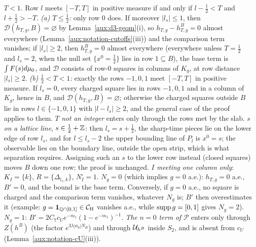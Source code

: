 \begin{auxrem}\label{aux:d3-boundary}
\emph{$T<1$.}  Row $l$ meets $[-T,T]$ in positive measure if and only if $l-\frac12<T$ and
$l+\frac12>-T$.  \emph{(a) $T\le\frac12$:} only row $0$ does.  If moreover $|l_s|\le1$, then
$\mathcal D(h_{T,g},B)=\varnothing$ by Lemma~\ref{aux:d3-geom}(i), so $h_{T,g}-h_{T,g}^B=0$ almost
everywhere (Lemma~\ref{aux:notation-cutoffs}(iii)) and the comparison term vanishes; if
$|l_s|\ge2$, then $h_{T,g}^B=0$ almost everywhere (everywhere unless $T=\frac12$ and $l_s=2$, when the null
set $\{x^0=\frac12\}$ lies in row $1\subseteq B$), the base term is $\int F(s)d\mu_0$, and
$\mathcal D$ consists of row-$0$ squares in columns of $K_g$, at row distance $|l_s|\ge2$.
\emph{(b) $\frac12<T<1$:} exactly the rows $-1,0,1$ meet $[-T,T]$ in positive measure.  If
$l_s=0$, every charged square lies in rows $-1,0,1$ and in a column of $K_g$, hence in $B$, and
$\mathcal D(h_{T,g},B)=\varnothing$; otherwise the charged squares outside $B$ lie in rows
$l\in\{-1,0,1\}$ with $|l-l_s|\ge2$, and the general case of the proof applies to them.
\emph{$T$ not an integer} enters only through the rows met by the slab.
\emph{$s$ on a lattice line}, $s\in\frac12+\mathbb{Z}$: then $l_s=s+\frac12$, the sharp-time pieces lie on
the lower edge of row $l_s$, and for $l\le l_s-2$ the upper bounding line of $P_l$ is $x^0=s$; the
observable lies on the boundary line, outside the open strip, which is what separation requires.
Assigning such an $s$ to the lower row instead (closed squares) moves $B$ down one row; the proof
is unchanged.
\emph{$I$ meeting one column only}: $K_I=\{k\}$, $R=\{\Delta_{l_s,k}\}$, $N^\square_I=1$.
\emph{$N_g=0$} (which implies $g=0$ a.e.): $h_{T,g}=0$ a.e., $B'=0$, and the bound is the base
term.  Conversely, if $g=0$ a.e., no square is charged and the comparison term vanishes, whatever
$N_g$ is; $B'$ then overestimates it (example: $g=\mathbf 1_{\mathbb Q\cap[0,1]}\in\mathcal{C}_{\mathrm H}$ vanishes
a.e., while $\operatorname{supp} g=[0,1]$ gives $N_g=2$).
\emph{$N_g=1$}: $B'=2C_7c_Ue^{-m_1}(1-e^{-m_1})^{-1}$.
\emph{The $n=0$ term of $\mathscr P$} enters only through $Z(h^B)$ (the factor
$e^{3\lambda|a_0|N_B}$) and through $\mathcal U_{h^B}$ inside $S_2$, and is absent from $c_U$
(Lemma~\ref{aux:notation-cU}(iii)).
\end{auxrem}

